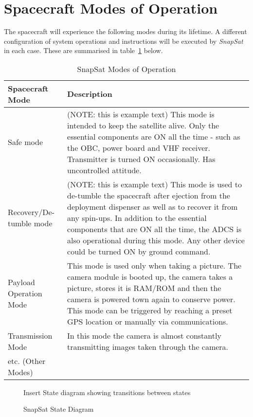 \section{Spacecraft Modes of Operation}
The spacecraft will experience the following modes during its lifetime. A different configuration of system operations and instructions will be executed by \textit{SnapSat} in each case. These are summarised in table~\ref{tab:modesofoperation} below.

\begin{table}[H]
    \centering
    \caption{SnapSat Modes of Operation}
    \vspace{0.15cm}
    \label{tab:modesofoperation}
    {\renewcommand{\arraystretch}{1.4}%
        \begin{tabular}{|>{\arraybackslash}m{4.5cm}|>{\arraybackslash}m{10.5cm}|}
            \hline
            \textbf{Spacecraft Mode} & \textbf{Description} \\ \hline\hline
            Safe mode & (NOTE: this is example text) This mode is intended to keep the satellite alive. Only the essential components are ON all the time - such as the OBC, power board and VHF receiver. Transmitter is turned ON occasionally. 
            Has uncontrolled attitude. 
             \\\hline
            Recovery/De-tumble mode & (NOTE: this is example text) This mode is used to de-tumble the spacecraft after ejection from the deployment dispenser as well as to recover it from any spin-ups. In addition to the essential components that are ON all the time, the ADCS is also operational during this mode. Any other device could be turned ON by ground command.  \\\hline
            Payload Operation Mode & This mode is used only when taking a picture.  The camera module is booted up, the camera takes a picture, stores it is RAM/ROM and then the camera is powered town again to conserve power.  This mode can be triggered by reaching a preset GPS location or manually via communications.  \\\hline
            Transmission Mode & In this mode the camera is almost constantly transmitting images taken through the camera. \\\hline
            etc. (Other Modes) &   \\\hline
        \end{tabular} } 
\end{table}

\begin{figure}[H]
    \centering
    \caption{SnapSat State Diagram}
    \vspace{0.15cm}
    Insert State diagram showing transitions between states
\end{figure}